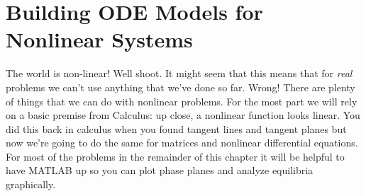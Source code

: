 \section{Building ODE Models for Nonlinear Systems}
The world is non-linear!  Well shoot. It might seem that this means that for {\it real}
problems we can't use anything that we've done so far.   Wrong!  There are plenty of
things that we can do with nonlinear problems.  For the most part we will rely on a basic
premise from Calculus: up close, a nonlinear function looks linear. You did this back in
calculus when you found tangent lines and tangent planes but now we're going to do the
same for matrices and nonlinear differential equations.  For most of the problems in the
remainder of this 
chapter it will be helpful to have MATLAB up so you can plot phase planes and analyze
equilibria graphically.



